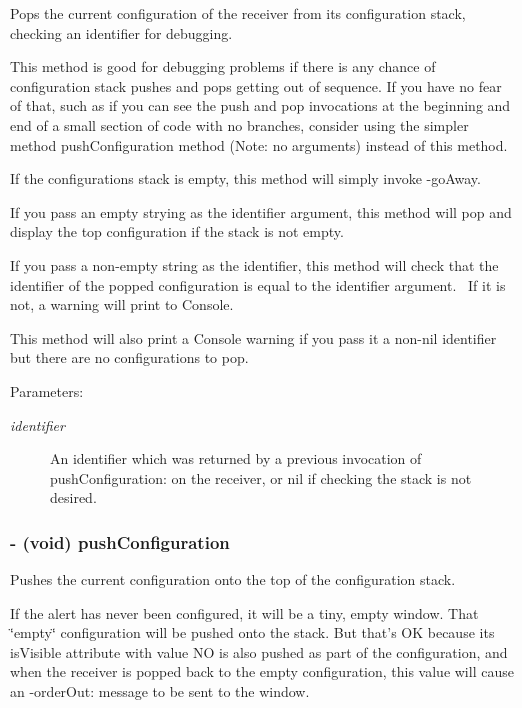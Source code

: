 Pops the current configuration of the receiver from its configuration stack, checking an identifier for debugging. 

This method is good for debugging problems if there is any chance of configuration stack pushes and pops getting out of sequence. If you have no fear of that, such as if you can see the push and pop invocations at the beginning and end of a small section of code with no branches, consider using the simpler method pushConfiguration method (Note: no arguments) instead of this method.

If the configurations stack is empty, this method will simply invoke -goAway.

If you pass an empty strying as the identifier argument, this method will pop and display the top configuration if the stack is not empty.

If you pass a non-empty string as the identifier, this method will check that the identifier of the popped configuration is equal to the identifier argument.~ If it is not, a warning will print to Console.

This method will also print a Console warning if you pass it a non-nil identifier but there are no configurations to pop. \begin{Desc}
\item[Parameters:]
\begin{description}
\item[{\em identifier}]An identifier which was returned by a previous invocation of pushConfiguration: on the receiver, or nil if checking the stack is not desired. \end{description}
\end{Desc}
\hypertarget{interface_s_s_y_alert_438a6ebc533213f49238105d8bad07bd}{
\subsubsection[{pushConfiguration}]{\setlength{\rightskip}{0pt plus 5cm}- (void) pushConfiguration }}
\label{interface_s_s_y_alert_438a6ebc533213f49238105d8bad07bd}


Pushes the current configuration onto the top of the configuration stack. 

If the alert has never been configured, it will be a tiny, empty window. That \char`\"{}empty\char`\"{} configuration will be pushed onto the stack. But that's OK because its isVisible attribute with value NO is also pushed as part of the configuration, and when the receiver is popped back to the empty configuration, this value will cause an -orderOut: message to be sent to the window.

